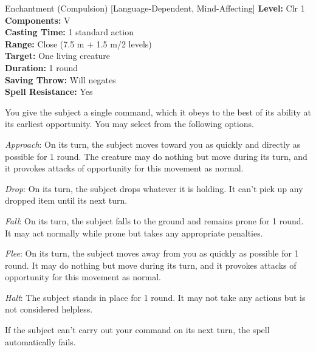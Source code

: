 {Enchantment (Compulsion) [Language-Dependent, Mind-Affecting]}
{
	\textbf{Level:}
	Clr 1\\
	\textbf{Components:}
	V\\
	\textbf{Casting Time:}
	1 standard action\\
	\textbf{Range:}
	Close (7.5 m + 1.5 m/2 levels)\\
	\textbf{Target:}
	One living creature\\
	\textbf{Duration:}
	1 round\\
	\textbf{Saving Throw:}
	Will negates\\
	\textbf{Spell Resistance:}
	Yes\\
}
{
	You give the subject a single command, which it obeys to the best of its ability at its earliest opportunity. You may select from the following options.

	\textit{Approach}:
	On its turn, the subject moves toward you as quickly and directly as possible for 1 round. The creature may do nothing but move during its turn, and it provokes attacks of opportunity for this movement as normal.

	\textit{Drop}:
	On its turn, the subject drops whatever it is holding. It can't pick up any dropped item until its next turn.

	\textit{Fall}:
	On its turn, the subject falls to the ground and remains prone for 1 round. It may act normally while prone but takes any appropriate penalties.

	\textit{Flee}:
	On its turn, the subject moves away from you as quickly as possible for 1 round. It may do nothing but move during its turn, and it provokes attacks of opportunity for this movement as normal.

	\textit{Halt}:
	The subject stands in place for 1 round. It may not take any actions but is not considered helpless.

	If the subject can't carry out your command on its next turn, the spell automatically fails.

}
